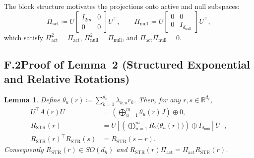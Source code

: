 \documentclass[11pt]{article}
\newcommand{\Real}{\mathbb{R}}
\newtheorem{lemma}{Lemma}
\begin{document}
The block structure motivates the projections onto active and null subspaces:
\begin{equation}
  \Pi_{\mathrm{act}} \coloneqq U
  \begin{bmatrix}
    I_{2m} & 0\\
    0 & 0
  \end{bmatrix}
  U^\top,
  \qquad
  \Pi_{\mathrm{null}} \coloneqq U
  \begin{bmatrix}
    0 & 0\\
    0 & I_{d_{\mathrm{null}}}
  \end{bmatrix}
  U^\top,
  \label{eq:appendix-projections}
\end{equation}
which satisfy $\Pi_{\mathrm{act}}^2 = \Pi_{\mathrm{act}}$, $\Pi_{\mathrm{null}}^2 = \Pi_{\mathrm{null}}$, and
$\Pi_{\mathrm{act}}\Pi_{\mathrm{null}} = 0$.

\subsection*{F.2\quad Proof of Lemma~2 (Structured Exponential and Relative Rotations)}

\begin{lemma}\label{lem:appendix-structured-exponential}
Define $\theta_u(r) \coloneqq \sum_{k=1}^{d_c} \lambda_{k,u} r_k$.  Then, for any $r,s\in\Real^{d_c}$,
\begin{align}
  U^\top A(r) U
    &= \left(\bigoplus_{u=1}^{m} \theta_u(r) J\right) \oplus 0,
     \label{eq:appendix-block-A}\\
  R_{\mathrm{STR}}(r)
    &= U \left[\left(\bigoplus_{u=1}^{m} R_2\big(\theta_u(r)\big)\right) \oplus I_{d_{\mathrm{null}}}\right] U^\top,
     \label{eq:appendix-block-R}\\
  R_{\mathrm{STR}}(r)^\top R_{\mathrm{STR}}(s)
    &= R_{\mathrm{STR}}(s-r).
     \label{eq:appendix-relative-rotation}
\end{align}
Consequently $R_{\mathrm{STR}}(r)\in SO(d_h)$ and $R_{\mathrm{STR}}(r)\Pi_{\mathrm{act}} = \Pi_{\mathrm{act}} R_{\mathrm{STR}}(r)$.
\end{lemma}
\end{document}
